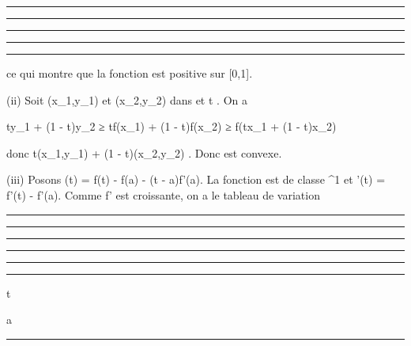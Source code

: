 \begin{center}\rule{3in}{0.4pt}\end{center}

\begin{center}\rule{3in}{0.4pt}\end{center}

\begin{center}\rule{3in}{0.4pt}\end{center}

\begin{center}\rule{3in}{0.4pt}\end{center}

\begin{center}\rule{3in}{0.4pt}\end{center}

ce qui montre que la fonction \phi est positive sur [0,1].

(ii) Soit (x_1,y_1) et (x_2,y_2)
dans \Gamma et t \in [0,1]. On a

ty_1 + (1 - t)y_2 ≥ tf(x_1) + (1 -
t)f(x_2) ≥ f(tx_1 + (1 - t)x_2)

donc t(x_1,y_1) + (1 - t)(x_2,y_2) \in
\Gamma. Donc \Gamma est convexe.

(iii) Posons \phi(t) = f(t) - f(a) - (t - a)f'(a). La fonction \phi est de
classe ^1 et \phi'(t) = f'(t) - f'(a). Comme f' est croissante,
on a le tableau de variation

\begin{center}\rule{3in}{0.4pt}\end{center}

\begin{center}\rule{3in}{0.4pt}\end{center}

\begin{center}\rule{3in}{0.4pt}\end{center}

\begin{center}\rule{3in}{0.4pt}\end{center}

\begin{center}\rule{3in}{0.4pt}\end{center}

\begin{center}\rule{3in}{0.4pt}\end{center}

t

a

\begin{center}\rule{3in}{0.4pt}\end{center}

